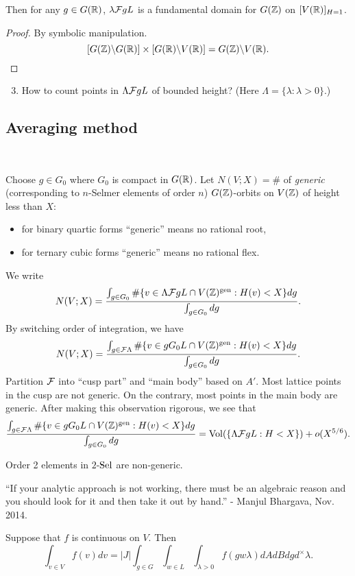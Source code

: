 \documentclass[12pt,amsfont]{amsart}
\begin{document}
Then for any $g \in G({\mathbb R})$, $\lambda \mathcal{F} g L$ is a fundamental domain for $G({\mathbb Z})$ on $[V({\mathbb R})]_{H=1}$. 
\begin{proof} By symbolic manipulation. 
$$\displaystyle [G({\mathbb Z}) \backslash G({\mathbb R})] \times [G({\mathbb R}) \backslash V({\mathbb R})] = G({\mathbb Z}) \backslash V({\mathbb R}).$$
\end{proof}
\begin{enumerate}
\setcounter{enumi}{2}
\item 
How to count points in $\Lambda \mathcal{F} g L$ of bounded height? (Here $\Lambda = \{\lambda: \lambda > 0\}$.) 
\end{enumerate}
\subsection{Averaging method}
{\ }

Choose $g \in G_0$ where $G_0$ is compact in $G({\mathbb R})$. Let $N(V; X) = \#$ of \emph{generic} (corresponding to $n$-Selmer elements of order $n$) $G({\mathbb Z})$-orbits on $V({\mathbb Z})$ of height less than $X$:
\begin{itemize}
\item
for binary quartic forms ``generic'' means no rational root,
\item
 for ternary cubic forms ``generic'' means no rational flex. 
 \end{itemize}  
 We write
$$\displaystyle N(V; X) = \frac{\int_{g \in G_0} \# \{v \in \Lambda \mathcal{F} g L \cap V({\mathbb Z})^{\text{gen}} : H(v) < X \} dg}{\int_{g \in G_0} dg}.$$
By switching order of integration, we have
$$\displaystyle N(V; X) = \frac{\int_{g \in \mathcal{F} \Lambda} \# \{v \in g G_0 L \cap V({\mathbb Z})^{\text{gen}} : H(v) < X\} dg}{\int_{g \in G_0} dg}.$$
Partition $\mathcal{F}$ into ``cusp part'' and ``main body'' based on $A'$.  Most lattice points in the cusp are not generic. On the contrary, most points in the main body are generic. After making this observation rigorous, we see that
$$\displaystyle \frac{\int_{g \in \mathcal{F} \Lambda} \# \{v \in g G_0 L \cap V({\mathbb Z})^{\text{gen}} : H(v) < X\} dg}{\int_{g \in G_0} dg} = \operatorname{Vol}(\{\Lambda \mathcal{F} g L : H < X\}) + o(X^{5/6}).$$
\begin{rmk} Order 2 elements in $2$-$\operatorname{Sel}$ are non-generic.
\end{rmk}
\begin{rmk} ``If your analytic approach is not working, there must be an algebraic reason and you should look for it and then take it out by hand.'' - Manjul Bhargava, Nov. 2014. 
\end{rmk}
\begin{lem} Suppose that $f$ is continuous on $V$. Then 
$$\displaystyle \int_{v \in V} f(v)dv = |J| \int_{g \in G} \int_{w \in L} \int_{\lambda > 0} f(gw\lambda) dA dB dg d^\times \lambda.$$
\end{lem}
\end{document}
